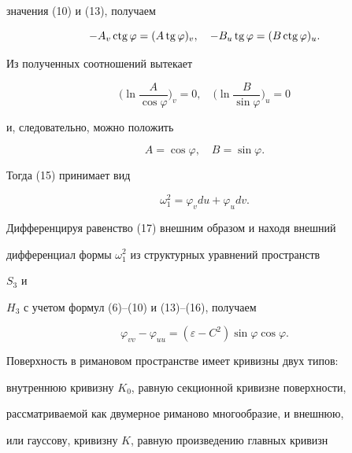 значения (10) и (13), получаем 


$$ 


-A_v\ctg\varphi=(A\tg\varphi)_v,\quad 


-B_u\tg\varphi=(B\ctg\varphi)_u. 


$$ 


Из полученных соотношений вытекает 


$$ 


\bigg(\ln\frac{A}{\cos\varphi} \bigg)_v=0,\quad 


\bigg(\ln\frac{B}{\sin\varphi} \bigg)_u=0 


$$ 


и, следовательно, можно положить 


\begin{equation} 


A=\cos\varphi,\quad B=\sin\varphi. 


\end{equation} 


Тогда (15) принимает вид


\begin{equation} 


\omega^2_1=\varphi_v du+\varphi_u dv. 


\end{equation} 


Дифференцируя равенство (17) внешним образом и находя внешний 


дифференциал формы $\omega^2_1$ из структурных уравнений пространств 


$S_3$ и 


$H_3$ с учетом формул (6)--(10) и (13)--(16), получаем


\begin{equation} 


\varphi_{v v}-\varphi_{u u}=(\varepsilon-C^2)\sin\varphi 


\cos\varphi. 


\end{equation} 


 


Поверхность в римановом пространстве имеет кривизны двух типов: 


внутреннюю кривизну $K_0$, равную секционной кривизне поверхности, 


рассматриваемой как двумерное риманово многообразие, и внешнюю,


или гауссову, кривизну $K$, равную произведению главных кривизн 


